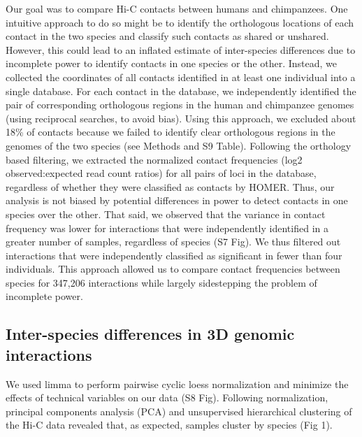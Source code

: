 Our goal was to compare Hi-C contacts between humans and chimpanzees. One intuitive approach to do so might be to identify the orthologous locations of each contact in the two species and classify such contacts as shared or unshared. However, this could lead to an inflated estimate of inter-species differences due to incomplete power to identify contacts in one species or the other. Instead, we collected the coordinates of all contacts identified in at least one individual into a single database. For each contact in the database, we independently identified the pair of corresponding orthologous regions in the human and chimpanzee genomes (using reciprocal searches, to avoid bias). Using this approach, we excluded about 18\% of contacts because we failed to identify clear orthologous regions in the genomes of the two species (see Methods and S9 Table). Following the orthology based filtering, we extracted the normalized contact frequencies (log2 observed:expected read count ratios) for all pairs of loci in the database, regardless of whether they were classified as contacts by HOMER. Thus, our analysis is not biased by potential differences in power to detect contacts in one species over the other. That said, we observed that the variance in contact frequency was lower for interactions that were independently identified in a greater number of samples, regardless of species (S7 Fig). We thus filtered out interactions that were independently classified as significant in fewer than four individuals. This approach allowed us to compare contact frequencies between species for 347,206 interactions while largely sidestepping the problem of incomplete power.

\subsection{Inter-species differences in 3D genomic interactions}
We used limma \cite{Smyth.2004} to perform pairwise cyclic loess normalization and minimize the effects of technical variables on our data (S8 Fig). Following normalization, principal components analysis (PCA) and unsupervised hierarchical clustering of the Hi-C data revealed that, as expected, samples cluster by species (Fig 1).

